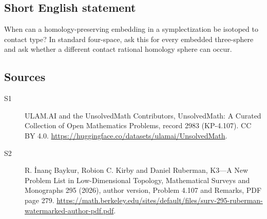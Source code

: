 \documentclass[11pt]{article}
\begin{document}
\subsection{Short English statement}
When can a homology-preserving embedding in a symplectization be isotoped to contact type? In standard four-space, ask this for every embedded three-sphere and ask whether a different contact rational homology sphere can occur.
\subsection{Sources}
\begin{description}
\item[\hypertarget{source:2983:1}{S1}] ULAM.AI and the UnsolvedMath Contributors, UnsolvedMath: A Curated Collection of Open Mathematics Problems, record 2983 (KP-4.107). CC BY 4.0. \url{https://huggingface.co/datasets/ulamai/UnsolvedMath}.
\item[\hypertarget{source:2983:2}{S2}] R. İnanç Baykur, Robion C. Kirby and Daniel Ruberman, K3—A New Problem List in Low-Dimensional Topology, Mathematical Surveys and Monographs 295 (2026), author version, Problem 4.107 and Remarks, PDF page 279. \url{https://math.berkeley.edu/sites/default/files/surv-295-ruberman-watermarked-author-pdf.pdf}.
\end{description}
\label{end:2983}
\end{document}

